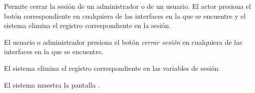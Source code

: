 %
%

{
  Permite cerrar la sesión de un administrador o de un usuario. El actor
  presiona el botón correspondiente en cualquiera de las interfaces en
  la que se encuentre y el sistema elimina el registro correspondiente
  en la sesión.

  \begin{trayectoriaPrincipal}

    \item El usuario o administrador presiona el botón \textit{cerrar sesión}
      en cualquiera de las interfaces en la que se encuentre.

    \item El sistema elimina el registro correspondiente en las variables
      de sesión.

    \item El sistema muestra la pantalla
      .

  \end{trayectoriaPrincipal}
}
